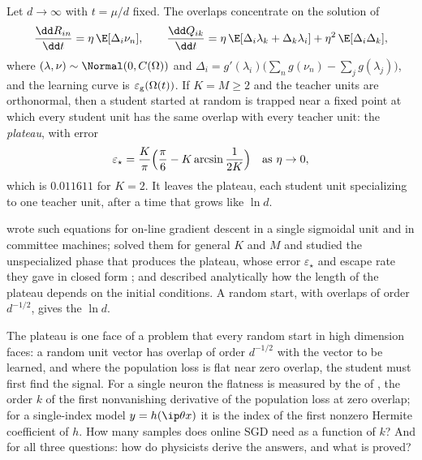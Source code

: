 \begin{refsection}
\begin{physicsbox}
Let $d\to\infty$ with $t=\mu/d$ fixed. The overlaps concentrate on the solution of
\begin{equation}\label{eq:sgd:ode}
\frac{\dd R_{in}}{\dd t}=\eta\,\E[\Delta_i\nu_n],\qquad\frac{\dd Q_{ik}}{\dd t}=\eta\,\E[\Delta_i\lambda_k+\Delta_k\lambda_i]+\eta^2\,\E[\Delta_i\Delta_k],
\end{equation}
where $(\lambda,\nu)\sim\Normal(0,C(\Omega))$ and $\Delta_i=g'(\lambda_i)\bigl(\sum_ng(\nu_n)-\sum_jg(\lambda_j)\bigr)$, and the learning curve is $\varepsilon_{\mathrm g}(\Omega(t))$. If $K=M\ge2$ and the teacher units are orthonormal, then a student started at random is trapped near a fixed point at which every student unit has the same overlap with every teacher unit: the \emph{plateau}, with error
\[
\varepsilon_\star=\frac K\pi\Bigl(\frac\pi6-K\arcsin\frac1{2K}\Bigr)\quad\text{as }\eta\to0,
\]
which is $0.011611$ for $K=2$. It leaves the plateau, each student unit specializing to one teacher unit, after a time that grows like $\ln d$.
\end{physicsbox}

\textcite{BiehlSchwarze1995} wrote such equations for on-line gradient descent in a single sigmoidal unit and in committee machines; \textcite{SaadSolla1995a,SaadSolla1995b} solved them for general $K$ and $M$ and studied the unspecialized phase that produces the plateau, whose error $\varepsilon_\star$ and escape rate they gave in closed form \parencite{SaadSolla1995c}; and \textcite{BiehlRieglerWohler1996} described analytically how the length of the plateau depends on the initial conditions. A random start, with overlaps of order $d^{-1/2}$, gives the $\ln d$.

The plateau is one face of a problem that every random start in high dimension faces: a random unit vector has overlap of order $d^{-1/2}$ with the vector to be learned, and where the population loss is flat near zero overlap, the student must first find the signal. For a single neuron the flatness is measured by the  of \textcite{BenArousGheissariJagannath2021}, the order $k$ of the first nonvanishing derivative of the population loss at zero overlap; for a single-index model $y=h(\ip\theta x)$ it is the index of the first nonzero Hermite coefficient of $h$. How many samples does online SGD need as a function of $k$? And for all three questions: how do physicists derive the answers, and what is proved?


\end{refsection}
